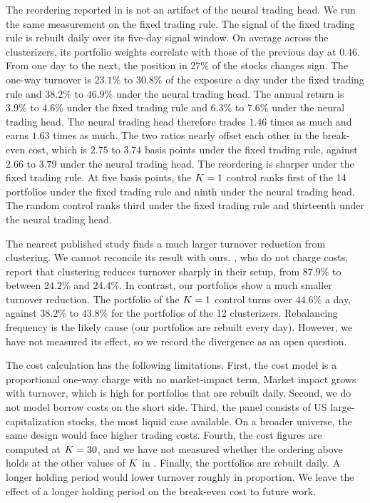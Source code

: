 The reordering reported in  is not an artifact of the neural trading head. We run the same measurement on the fixed trading rule. The signal of the fixed trading rule is rebuilt daily over its five-day signal window. On average across the clusterizers, its portfolio weights correlate with those of the previous day at $0.46$. From one day to the next, the position in $27\%$ of the stocks changes sign. The one-way turnover is $23.1\%$ to $30.8\%$ of the exposure a day under the fixed trading rule and $38.2\%$ to $46.9\%$ under the neural trading head. The annual return is $3.9\%$ to $4.6\%$ under the fixed trading rule and $6.3\%$ to $7.6\%$ under the neural trading head. The neural trading head therefore trades $1.46$ times as much and earns $1.63$ times as much. The two ratios nearly offset each other in the break-even cost, which is $2.75$ to $3.74$ basis points under the fixed trading rule, against $2.66$ to $3.79$ under the neural trading head. The reordering is sharper under the fixed trading rule. At five basis points, the $K=1$ control ranks first of the 14 portfolios under the fixed trading rule and ninth under the neural trading head. The random control ranks third under the fixed trading rule and thirteenth under the neural trading head.

The nearest published study finds a much larger turnover reduction from clustering. We cannot reconcile its result with ours. \citet{brutti2026orthogonal}, who do not charge costs, report that clustering reduces turnover sharply in their setup, from $87.9\%$ to between $24.2\%$ and $24.4\%$. In contrast, our portfolios show a much smaller turnover reduction. The portfolio of the $K=1$ control turns over $44.6\%$ a day, against $38.2\%$ to $43.8\%$ for the portfolios of the 12 clusterizers. Rebalancing frequency is the likely cause (our portfolios are rebuilt every day). However, we have not measured its effect, so we record the divergence as an open question.

The cost calculation has the following limitations. First, the cost model is a proportional one-way charge with no market-impact term. Market impact grows with turnover, which is high for portfolios that are rebuilt daily. Second, we do not model borrow costs on the short side. Third, the panel consists of US large-capitalization stocks, the most liquid case available. On a broader universe, the same design would face higher trading costs. Fourth, the cost figures are computed at $K=30$, and we have not measured whether the ordering above holds at the other values of $K$ in . Finally, the portfolios are rebuilt daily. A longer holding period would lower turnover roughly in proportion. We leave the effect of a longer holding period on the break-even cost to future work.
